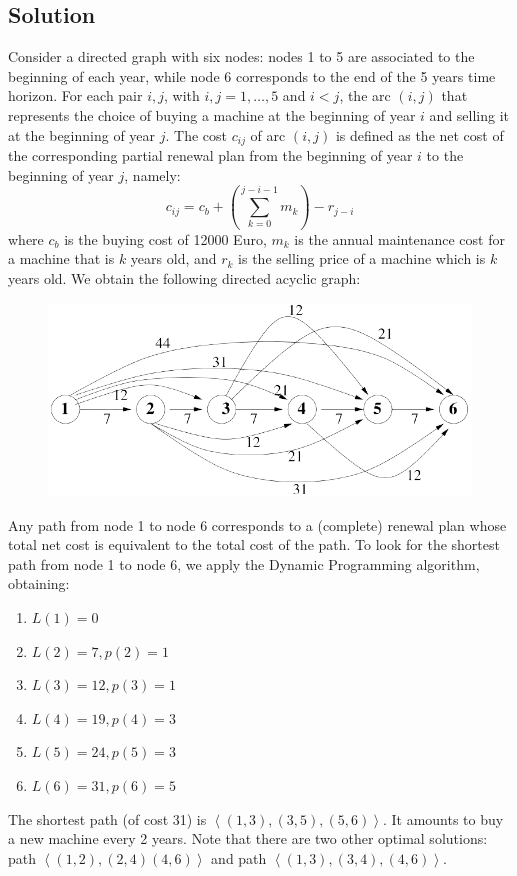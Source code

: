 \documentclass[12pt, a4paper]{report}
\newtheorem[style=M,bodystyle=\normalfont]{theorem}{Theorem}
\newtheorem[style=M,bodystyle=\normalfont]{corollary}{Corollary}
\newtheorem[style=M,bodystyle=\normalfont]{lemma}{Lemma}
\newtheorem[style=M,bodystyle=\normalfont]{definition}{Definition}
\begin{document}
    \subsection*{Solution}
        Consider a directed graph with six nodes: nodes 1 to 5 are associated to the beginning of each year, while node 6 corresponds to the end of the 5 years time horizon.
        For each pair $i, j$, with $i, j = 1, \dots , 5$ and $i < j$, the arc $(i, j)$ that represents the choice of buying a machine at the beginning of year $i$ and 
        selling it at the beginning of year $j$. The cost $c_{ij}$ of arc $(i, j)$ is defined as the net cost of the corresponding partial renewal plan from the beginning of 
        year $i$ to the beginning of year $j$, namely: 
        \[c_{ij}=c_b+\left( \sum_{k=0}^{j-i-1}m_k \right)-r_{j-i}\]
        where $c_b$ is the buying cost of 12000 Euro, $m_k$ is the annual maintenance cost for a machine that is $k$ years old, and $r_k$ is the selling price of a machine 
        which is $k$ years old. We obtain the following directed acyclic graph:
        \begin{figure}[H]
            \centering
            \includegraphics[width=0.75\linewidth]{images/dag.png}
        \end{figure}
        Any path from node 1 to node 6 corresponds to a (complete) renewal plan whose total net cost is equivalent to the total cost of the path. To look for the shortest 
        path from node 1 to node 6, we apply the Dynamic Programming algorithm, obtaining:
        \begin{enumerate}
            \item $L(1) = 0$
            \item $L(2) = 7, p(2) = 1$
            \item $L(3) = 12, p(3) = 1$
            \item $L(4) = 19, p(4) = 3$
            \item $L(5) = 24, p(5) = 3$
            \item $L(6) = 31, p(6) = 5$
        \end{enumerate}
        The shortest path (of cost 31) is $\left\langle (1, 3),(3, 5),(5, 6)\right\rangle $. It amounts to buy a new machine every 2 years. Note that there are two other 
        optimal solutions: path $\left\langle (1, 2),(2, 4)(4, 6)\right\rangle $ and path $\left\langle (1, 3),(3, 4),(4, 6)\right\rangle $.
\end{document}
